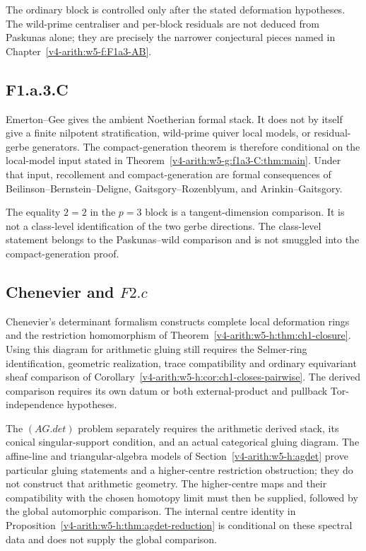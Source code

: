 The ordinary block is controlled only after the stated deformation
hypotheses.  The wild-prime centraliser and per-block residuals are not
deduced from Paskunas alone; they are precisely the narrower conjectural
pieces named in Chapter~\ref{v4-arith:w5-f:F1a3-AB}.

\subsection{F1.a.3.C}
\label{v4-arith:w6-j:ch51}

Emerton--Gee gives the ambient Noetherian formal stack.  It does not by
itself give a finite nilpotent stratification, wild-prime quiver local
models, or residual-gerbe generators.  The compact-generation theorem is
therefore conditional on the local-model input stated in
Theorem~\ref{v4-arith:w5-g:f1a3-C:thm:main}.  Under that input, recollement and
compact-generation are formal consequences of
Beilinson--Bernstein--Deligne, Gaitsgory--Rozenblyum, and
Arinkin--Gaitsgory.

The equality \(2=2\) in the \(p=3\) block is a tangent-dimension
comparison.  It is not a class-level identification of the two gerbe
directions.  The class-level statement belongs to the Paskunas--wild
comparison and is not smuggled into the compact-generation proof.

\subsection{Chenevier and \(F2.c\)}
\label{v4-arith:w6-j:ch52}

Chenevier's determinant formalism constructs complete local deformation
rings and the restriction homomorphism of
Theorem~\ref{v4-arith:w5-h:thm:ch1-closure}.
Using this diagram for arithmetic gluing still requires the Selmer-ring
identification, geometric realization, trace compatibility and ordinary
equivariant sheaf comparison of
Corollary~\ref{v4-arith:w5-h:cor:ch1-closes-pairwise}.
The derived comparison requires its own datum or both external-product
and pullback Tor-independence hypotheses.

The $(AG.det)$ problem separately requires the arithmetic derived stack,
its conical singular-support condition, and an actual categorical gluing
diagram. The affine-line and triangular-algebra models of
Section~\ref{v4-arith:w5-h:agdet} prove particular gluing statements
and a higher-centre restriction obstruction; they do not construct that
arithmetic geometry. The higher-centre maps and their compatibility with
the chosen homotopy limit must then be supplied, followed by the global
automorphic comparison. The internal centre identity in
Proposition~\ref{v4-arith:w5-h:thm:agdet-reduction} is conditional on
these spectral data and does not supply the global comparison.

